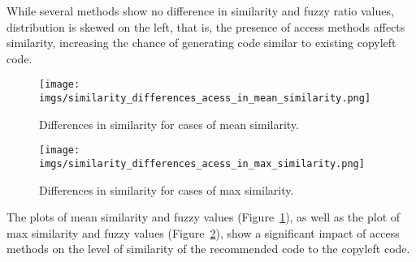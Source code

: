 While several methods show no difference in similarity and fuzzy ratio values, distribution is skewed on the left, that is, the presence of access methods affects similarity, increasing the chance of generating code similar to existing copyleft code.




\begin{figure}[h]
    \centering
    \texttt{[image: imgs/similarity\_differences\_acess\_in\_mean\_similarity.png]}
    \vspace{-10pt} 
    
    \caption{Differences in similarity for cases of mean similarity.}
    \label{fig:similarity_differences_acess_in_mean_similarity}
\end{figure}

\begin{figure}
    \centering
    \texttt{[image: imgs/similarity\_differences\_acess\_in\_max\_similarity.png]}
    \vspace{-10pt} 
    
    \caption{Differences in similarity for cases of max similarity.}
    \label{fig:similarity_differences_acess_in_max_similarity}
\end{figure}

The plots of mean similarity and fuzzy values (Figure~\ref{fig:similarity_differences_acess_in_mean_similarity}), as well as the plot of max similarity and fuzzy values (Figure~\ref{fig:similarity_differences_acess_in_max_similarity}), show a significant impact of access methods on the level of similarity of the recommended code to the copyleft code. 

